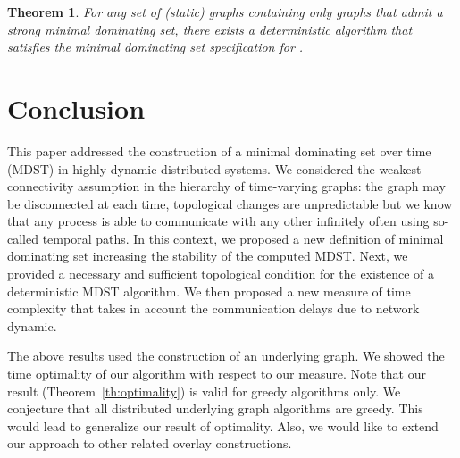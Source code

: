 \documentclass{article}
\newtheorem{theorem}{Theorem}
\begin{document}
\begin{theorem}
For any set of (static) graphs  containing only graphs that admit a strong minimal dominating set, there exists a deterministic algorithm that satisfies the minimal dominating set specification for .
\end{theorem}

\section{Conclusion}\label{sec:conclu}

This paper addressed the construction of a minimal dominating set over time (MDST) in highly dynamic distributed systems. We considered the weakest connectivity assumption in the hierarchy of time-varying graphs: the graph may be disconnected at each time, topological changes are unpredictable but we know that any process is able to communicate with any other infinitely often using so-called temporal paths. In this context, we proposed a new definition of minimal dominating set increasing the stability of the computed MDST. Next, we provided a necessary and sufficient topological condition for the existence of a deterministic MDST algorithm. We then proposed a new measure of time complexity that takes in account the communication delays due to network dynamic.  

The above results used the construction of an underlying graph. We showed the time optimality of our algorithm with respect to our measure. Note that our result (Theorem~\ref{th:optimality}) is valid for greedy algorithms only. We conjecture that all distributed underlying graph algorithms are greedy. This would lead to generalize our result of optimality. Also, we would like to extend our approach to other related overlay constructions. 



\end{document}
